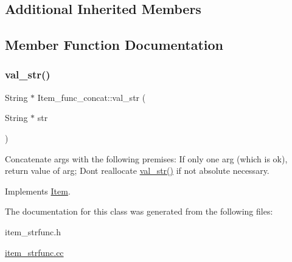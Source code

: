 \subsection*{Additional Inherited Members}


\subsection{Member Function Documentation}
\mbox{\label{classItem__func__concat_a254950f94738bc407689275cf64bbcaa}} 
\subsubsection{\texorpdfstring{val\+\_\+str()}{val\_str()}}
{\footnotesize\ttfamily String $\ast$ Item\+\_\+func\+\_\+concat\+::val\+\_\+str (\begin{DoxyParamCaption}\item[{String $\ast$}]{str }\end{DoxyParamCaption})\hspace{0.3cm}{\ttfamily [virtual]}}

Concatenate args with the following premises\+: If only one arg (which is ok), return value of arg; Don\textquotesingle{}t reallocate \mbox{\hyperlink{classItem__func__concat_a254950f94738bc407689275cf64bbcaa}{val\+\_\+str()}} if not absolute necessary. 

Implements \mbox{\hyperlink{classItem}{Item}}.



The documentation for this class was generated from the following files\+:\begin{DoxyCompactItemize}
\item 
item\+\_\+strfunc.\+h\item 
\mbox{\hyperlink{item__strfunc_8cc}{item\+\_\+strfunc.\+cc}}\end{DoxyCompactItemize}
